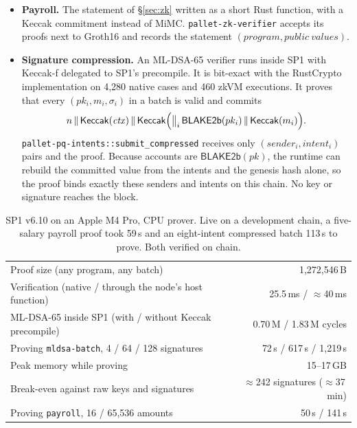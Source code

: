 \documentclass[11pt]{article}
\theoremstyle{definition}
\theoremstyle{remark}
\begin{document}
\begin{itemize}[leftmargin=*]
  \item \textbf{Payroll.} The statement of \S\ref{sec:zk} written as a short Rust function,
        with a Keccak commitment instead of MiMC. \texttt{pallet-zk-verifier} accepts its proofs
        next to Groth16 and records the statement $(\mathit{program}, \mathit{public\ values})$.
  \item \textbf{Signature compression.} An ML-DSA-65 verifier runs inside SP1 with Keccak-f
        delegated to SP1's precompile. It is bit-exact with the RustCrypto implementation on 4{,}280
        native cases and 460 zkVM executions. It proves that every $(pk_i, m_i, \sigma_i)$ in a
        batch is valid and commits
        \[
          n \,\|\, \mathsf{Keccak}(\mathit{ctx}) \,\|\, \mathsf{Keccak}\Bigl(\textstyle\big\|_i\,
          \mathsf{BLAKE2b}(pk_i) \,\|\, \mathsf{Keccak}(m_i)\Bigr).
        \]
        \texttt{pallet-pq-intents::submit\_compressed} receives only $(\mathit{sender}_i,
        \mathit{intent}_i)$ pairs and the proof. Because accounts are $\mathsf{BLAKE2b}(pk)$, the
        runtime can rebuild the committed value from the intents and the genesis hash alone, so
        the proof binds exactly these senders and intents on this chain. No key or signature
        reaches the block.
\end{itemize}

\begin{table}[ht]
\centering\small
\begin{tabular}{@{}lr@{}}
\toprule
Proof size (any program, any batch) & 1{,}272{,}546\,B \\
Verification (native / through the node's host function) & 25.5\,ms / $\approx$40\,ms \\
ML-DSA-65 inside SP1 (with / without Keccak precompile) & 0.70\,M / 1.83\,M cycles \\
Proving \texttt{mldsa-batch}, 4 / 64 / 128 signatures & 72\,s / 617\,s / 1{,}219\,s \\
Peak memory while proving & 15--17\,GB \\
Break-even against raw keys and signatures & $\approx$242 signatures ($\approx$37\,min) \\
Proving \texttt{payroll}, 16 / 65{,}536 amounts & 50\,s / 141\,s \\
\bottomrule
\end{tabular}
\caption{SP1 v6.10 on an Apple M4 Pro, CPU prover. Live on a development chain, a five-salary
payroll proof took 59\,s and an eight-intent compressed batch 113\,s to prove. Both verified on
chain.}
\label{tab:sp1}
\end{table}
\end{document}
